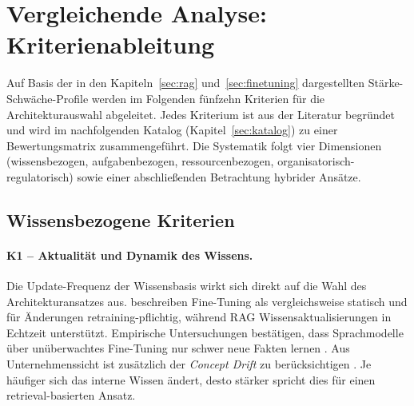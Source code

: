%

\section{Vergleichende Analyse: Kriterienableitung}
\label{sec:kriterien}

Auf Basis der in den Kapiteln~\ref{sec:rag} und~\ref{sec:finetuning} dargestellten Stärke-Schwäche-Profile werden im Folgenden fünfzehn Kriterien für die Architekturauswahl abgeleitet. Jedes Kriterium ist aus der Literatur begründet und wird im nachfolgenden Katalog (Kapitel~\ref{sec:katalog}) zu einer Bewertungsmatrix zusammengeführt. Die Systematik folgt vier Dimensionen (wissensbezogen, aufgabenbezogen, ressourcenbezogen, organisatorisch-re\-gu\-la\-to\-risch) sowie einer abschließenden Betrachtung hybrider Ansätze.

\subsection{Wissensbezogene Kriterien}
\label{sec:krit-wissen}

\paragraph{K1 -- Aktualität und Dynamik des Wissens.}\label{krit:k1}
Die Update-Frequenz der Wissensbasis wirkt sich direkt auf die Wahl des Architekturansatzes aus. \textcite[5]{Gao.2024} beschreiben Fine-Tuning als vergleichsweise statisch und für Änderungen retraining-pflichtig, während RAG Wissensaktualisierungen in Echtzeit unterstützt.
Empirische Untersuchungen bestätigen, dass Sprachmodelle über unüberwachtes Fine-Tuning nur schwer neue Fakten lernen \autocite[1]{Ovadia.2024}.
Aus Unternehmenssicht ist zusätzlich der \textit{Concept Drift} zu berücksichtigen \autocite[17f., 23]{Karakurt.2026}.
Je häufiger sich das interne Wissen ändert, desto stärker spricht dies für einen retrieval-basierten Ansatz.

